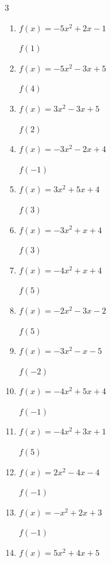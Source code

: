 \begin{multicols}{3}
\begin{enumerate}
$f(5)$
        \phantom{$= -62$}

  \item $f(x)=-5x^{2}+2x-1$

$f(1)$
        \phantom{$= -4$}

  \item $f(x)=-5x^{2}-3x+5$

$f(4)$
        \phantom{$= -87$}

  \item $f(x)=3x^{2}-3x+5$

$f(2)$
        \phantom{$= 11$}

  \item $f(x)=-3x^{2}-2x+4$

$f(-1)$
        \phantom{$= 3$}

  \item $f(x)=3x^{2}+5x+4$

$f(3)$
        \phantom{$= 46$}

  \item $f(x)=-3x^{2}+x+4$

$f(3)$
        \phantom{$= -20$}

  \item $f(x)=-4x^{2}+x+4$

$f(5)$
        \phantom{$= -91$}

  \item $f(x)=-2x^{2}-3x-2$

$f(5)$
        \phantom{$= -67$}

  \item $f(x)=-3x^{2}-x-5$

$f(-2)$
        \phantom{$= -15$}

\columnbreak %

  \item $f(x)=-4x^{2}+5x+4$

$f(-1)$
        \phantom{$= -5$}

  \item $f(x)=-4x^{2}+3x+1$

$f(5)$
        \phantom{$= -84$}

  \item $f(x)=2x^{2}-4x-4$

$f(-1)$
        \phantom{$= 2$}

  \item $f(x)=-x^{2}+2x+3$

$f(-1)$
        \phantom{$= 0$}

  \item $f(x)=5x^{2}+4x+5$


\end{enumerate}
\end{multicols}
